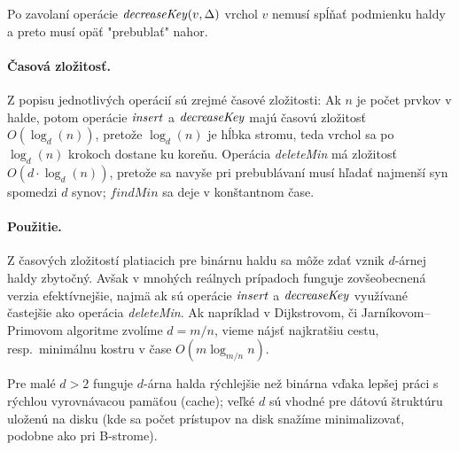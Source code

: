 Po zavolaní operácie $\mathop{\mathit{decreaseKey}}(v, \Delta)$ vrchol $v$ nemusí spĺňať podmienku haldy a preto musí opäť 
"prebublať" nahor.

\paragraph{Časová zložitosť.}
Z popisu jednotlivých operácií sú zrejmé časové zložitosti:
Ak $n$ je počet prvkov v halde, potom operácie $\mathop{\mathit{insert}}$ a $\mathop{\mathit{decreaseKey}}$ majú časovú zložitosť $O(\log_d(n))$, pretože 
$\log_d(n)$ je hĺbka stromu, teda vrchol sa po $\log_d(n)$ krokoch dostane ku koreňu. Operácia \emph{deleteMin} má 
zložitosť $O(d\cdot \log_d(n))$, pretože sa navyše pri prebublávaní musí hľadať najmenší syn spomedzi $d$ synov;
$\mathit{findMin}$ sa deje v konštantnom čase.

\paragraph{Použitie.}
Z časových zložitostí platiacich pre binárnu haldu sa môže zdať vznik $d$-árnej haldy zbytočný. Avšak v mnohých 
reálnych prípadoch funguje zovšeobecnená verzia efektívnejšie, najmä ak sú operácie $\mathop{\mathit{insert}}$ a $\mathop{\mathit{decreaseKey}}$
využívané častejšie ako operácia \emph{deleteMin}. Ak napríklad v Dijkstrovom, či Jarníkovom--Primovom
algoritme zvolíme $d=m/n$, vieme nájsť najkratšiu cestu, resp.\ minimálnu kostru v čase $O(m\log_{m/n} n)$.

Pre malé $d>2$ funguje $d$-árna halda rýchlejšie než binárna vďaka lepšej práci s rýchlou vyrovnávacou pamäťou
(cache); veľké $d$ sú vhodné pre dátovú štruktúru uloženú na disku (kde sa počet prístupov na disk snažíme minimalizovať,
podobne ako pri B-strome).

